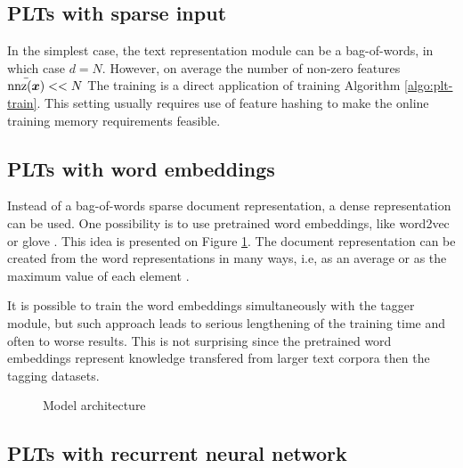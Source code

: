 \documentclass{article}
\newcommand{\sectionBefore}{-0pt}
\newcommand{\sectionAfter}{-0pt}
\begin{document}
\vspace{\sectionBefore}
\subsection{PLTs with sparse input}
\label{sec:sparse_input}
\vspace{\sectionAfter}

In the simplest case, the text representation module can be a bag-of-words, in which case $d=N$. However, on average the number of non-zero features $\bar{\mathrm{nnz}(\boldsymbol{x})} << N$ 
The training is a direct application of training Algorithm \ref{algo:plt-train}.
This setting usually requires use of feature hashing to make the online training memory requirements feasible. 

\vspace{\sectionBefore}
\subsection{PLTs with word embeddings}
\label{sec:sparse_input}
\vspace{\sectionAfter}

Instead of a bag-of-words sparse document representation, a dense representation can be used. 
One possibility is to use pretrained word embeddings, like word2vec \cite{word2vec} or glove \cite{glove}. This idea is presented on Figure \ref{pic:model-embedding}. The document representation can be created from the word representations in many ways, i.e, as an average \cite{!} or as the maximum value of each element \cite{!}.

It is possible to train the word embeddings simultaneously with the tagger module, but such approach leads to serious lengthening of the training time \cite{!!} and often to worse results\cite{!!}. This is not surprising since the pretrained word embeddings represent knowledge transfered from larger text corpora then the tagging datasets.

\begin{figure}
	\begin{center}
		
	\end{center}
	\caption{Model architecture}
	\label{pic:model-embedding}
\end{figure}


\vspace{\sectionBefore}
\subsection{PLTs with recurrent neural network}
\label{sec:sparse_input}
\vspace{\sectionAfter}
\end{document}
